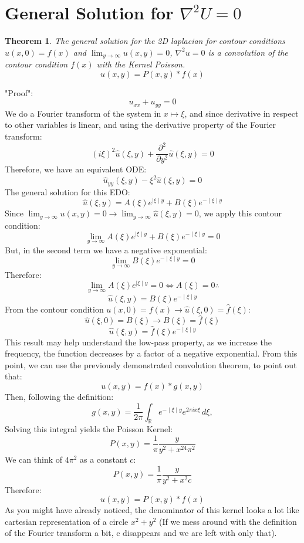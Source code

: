 \documentclass[12pt]{article}
\newtheorem{theorem}{Theorem}
\begin{document}
\section{General Solution for \(\nabla^2U=0\)}
\begin{theorem}
    The general solution for the 2D laplacian for contour conditions \(u(x,0)=f(x)\) and \(\lim_{y\rightarrow \infty} u(x,y)=0\), \(\nabla ^2u=0\) is a convolution of the contour condition \(f(x)\) with the Kernel Poisson.
    \[u(x,y)=P(x,y)*f(x)\]
\end{theorem}
"Proof":
\[
u_{xx}+u_{yy}=0
\]
We do a Fourier transform of the system in \(x\mapsto \xi\), and since derivative in respect to other variables is linear, and using the derivative property of the Fourier transform:
\[
(i\xi)^2\hat{u}(\xi,y)+\frac{\partial^2 }{\partial y^2}\hat{u}(\xi,y)=0
\]
Therefore, we have an equivalent ODE:
\[
\hat{u}_{yy}(\xi,y)-\xi^2\hat{u}(\xi,y)=0
\]
The general solution for this EDO:
\[\hat{u}(\xi,y)=A(\xi)e^{\mid\xi\mid y}+B(\xi)e^{-\mid \xi \mid y}\]
Since \(\lim_{y\rightarrow\infty} u(x,y)=0\rightarrow \lim_{y\rightarrow\infty}\hat{u}(\xi,y)=0\), we apply this contour condition:
\[
\lim_{y\rightarrow \infty}A(\xi)e^{\mid\xi\mid y}+B(\xi)e^{-\mid \xi \mid y}=0
\]
But, in the second term we have a negative exponential:
\[\lim_{y\rightarrow \infty}B(\xi)e^{-\mid \xi \mid y}=0\]
Therefore:
\[\lim_{y\rightarrow \infty}A(\xi)e^{\mid\xi\mid y}=0\Leftrightarrow A(\xi)=0 \therefore \]
\[\hat{u}(\xi,y)=B(\xi)e^{-\mid \xi \mid y}\]
From the contour condition \(u(x,0)=f(x)\rightarrow\hat{u}(\xi,0)=\hat{f}(\xi)\):
\[\hat{u}(\xi,0)=B(\xi)\rightarrow B(\xi)=\hat{f}(\xi)\]
\[\hat{u}(\xi,y)=\hat{f}(\xi)e^{-\mid \xi \mid y}\]
This result may help understand the low-pass property, as we increase the frequency, the function decreases by a factor of a negative exponential.
\newline
From this point, we can use the previously demonstrated convolution theorem, to point out that:
\[
u(x,y)=f(x)*g(x,y)
\]
Then, following the definition:
\[
g(x,y) =\frac{1}{2\pi} \int_{\mathbb{R}} e^{-\mid \xi \mid y} e^{2\pi i x \xi} \, d\xi,
\]
Solving this integral yields the Poisson Kernel:
\[
P(x,y)=\frac{1}{\pi}\frac{y}{y^2+x^24\pi^2}
\]
We can think of \(4\pi^2\) as a constant \(c\):
\[
P(x,y)=\frac{1}{\pi}\frac{y}{y^2+x^2c}
\]
Therefore:
\[
u(x,y)=P(x,y)*f(x)
\]
As you might have already noticed, the denominator of this kernel looks a lot like cartesian representation of a circle \(x^2+y^2\) (If we mess around with the definition of the Fourier transform a bit, c disappears and we are left with only that).
\end{document}
